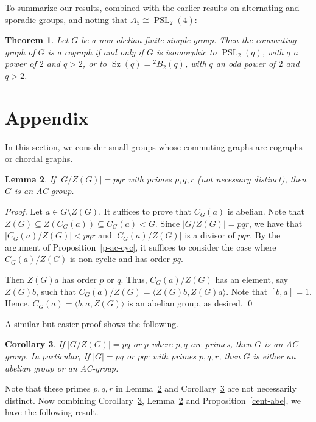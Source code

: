 \documentclass{elsarticle}
\newtheorem{theorem}{Theorem}[section]
\newtheorem{cor}[theorem]{Corollary}
\newtheorem{lemma}[theorem]{Lemma}
\newcommand{\PSL}{\mathop{\mathrm{PSL}}\nolimits}
\newcommand{\Sz}{\mathop{\mathrm{Sz}}\nolimits}
\begin{document}
\medskip

To summarize our results, combined with the earlier results on alternating
and sporadic groups, and noting that $A_5 \cong\PSL_2(4)$:

\begin{theorem}\label{Simple-cog}
Let $G$ be a non-abelian finite simple group. Then the commuting graph of $G$
is a cograph if and only if $G$ is isomorphic to $\PSL_2(q)$, with $q$ a power
of $2$ and $q>2$, or to $\Sz(q)={}^2B_2(q)$, with $q$ an odd power of $2$ and $q>2$.
\end{theorem}


\section{Appendix}\label{appendix}

In this section, we consider small groups whose commuting graphs are cographs or chordal graphs.


\begin{lemma}\label{sg-ac}
If $|G/Z(G)|=pqr$ with primes $p,q,r$ {\rm(}not necessary distinct{\rm)}, then $G$ is an
AC-group.
\end{lemma}

\begin{proof}
Let $a\in G\setminus Z(G)$. It suffices to prove that $C_G(a)$ is abelian. Note that $Z(G)\subseteq Z(C_G(a))\subseteq C_G(a)<G$. Since $|G/Z(G)|=pqr$, we have that $|C_G(a)/Z(G)|<pqr$ and $|C_G(a)/Z(G)|$ is a divisor of $pqr$. By the argument of Proposition~\ref{p-ac-cyc}, it suffices to consider
the case where $C_G(a)/Z(G)$ is non-cyclic and has order $pq$.

Then $Z(G)a$ has order $p$ or $q$. Thus, $C_G(a)/Z(G)$ has an element, say $Z(G)b$, such that $C_G(a)/Z(G)=\langle Z(G)b,Z(G)a\rangle$. Note that $[b,a]=1$. Hence, $C_G(a)=\langle b,a,Z(G)\rangle$ is an abelian group, as desired. \qed
\end{proof}

A similar but easier proof shows the following.

\begin{cor}\label{sg-co1}
If $|G/Z(G)|=pq$ or $p$ where $p,q$ are primes, then $G$ is an AC-group. In particular, If $|G|=pq$ or $pqr$ with primes $p,q,r$, then $G$ is either an abelian group or an AC-group.
\end{cor}

Note that these primes $p,q,r$ in Lemma~\ref{sg-ac} and Corollary~\ref{sg-co1} are not necessarily distinct.
Now combining Corollary~\ref{sg-co1},
Lemma~\ref{sg-ac} and Proposition~\ref{cent-abe}, we have the following result.
\end{document}
